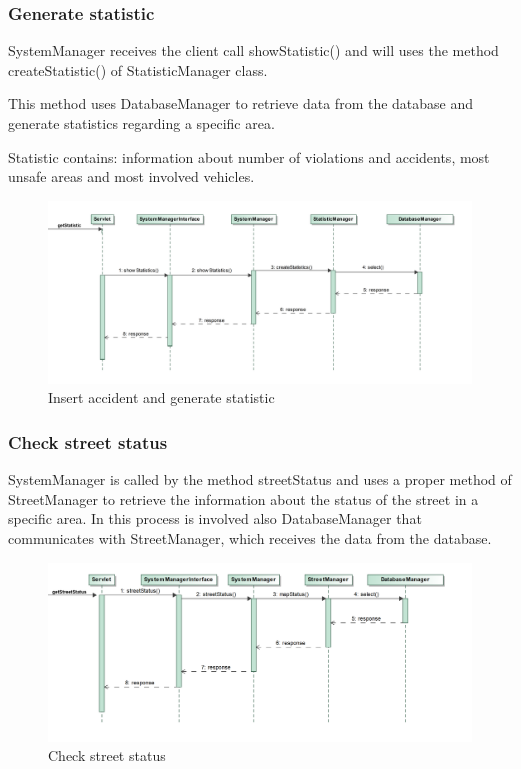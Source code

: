 \subsubsection{Generate statistic}
SystemManager receives the client call showStatistic() and will uses the method createStatistic() of StatisticManager class.

This method uses DatabaseManager to retrieve data from the database and generate statistics regarding a specific area.

Statistic contains: information about number of violations and accidents, most unsafe areas and most involved vehicles.
\begin{figure}[H]
	\centering
	\includegraphics[width=0.97\linewidth, height=0.35\textheight]{Images/RunTimeDiagram/Sequence4}
	\caption{Insert accident and generate statistic}
	\label{fig:Insert accident and generate statistic}
\end{figure}
\subsubsection{Check street status}
SystemManager is called by the method streetStatus and uses a proper method of StreetManager to retrieve the information about the status of the street in a specific area. In this process is involved also DatabaseManager that communicates with StreetManager, which receives the data from the database.
\begin{figure}[H]
	\centering
	\includegraphics[width=0.95\linewidth, height=0.35\textheight]{Images/RunTimeDiagram/Sequence5}
	\caption{Check street status}
	\label{fig:Check street status}
\end{figure}

